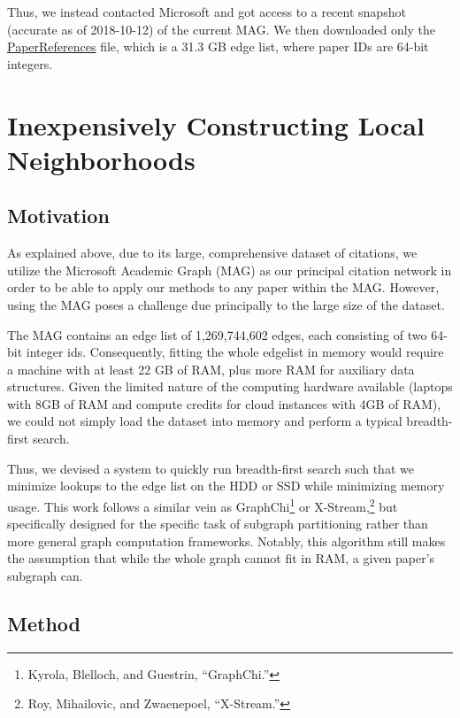 \documentclass[lettepaper,]{article}
\begin{document}
Thus, we instead contacted Microsoft and got access to a recent snapshot
(accurate as of 2018-10-12) of the current MAG. We then downloaded only
the
\href{https://docs.microsoft.com/en-us/academic-services/graph/reference-data-schema\#paperreferencestxt}{PaperReferences}
file, which is a 31.3 GB edge list, where paper IDs are 64-bit integers.

\hypertarget{inexpensively-constructing-local-neighborhoods}{%
\section{Inexpensively Constructing Local
Neighborhoods}\label{inexpensively-constructing-local-neighborhoods}}

\hypertarget{motivation}{%
\subsection{Motivation}\label{motivation}}

As explained above, due to its large, comprehensive dataset of
citations, we utilize the Microsoft Academic Graph (MAG) as our
principal citation network in order to be able to apply our methods to
any paper within the MAG. However, using the MAG poses a challenge due
principally to the large size of the dataset.

The MAG contains an edge list of 1,269,744,602 edges, each consisting of
two 64-bit integer ids. Consequently, fitting the whole edgelist in
memory would require a machine with at least 22 GB of RAM, plus more RAM
for auxiliary data structures. Given the limited nature of the computing
hardware available (laptops with 8GB of RAM and compute credits for
cloud instances with 4GB of RAM), we could not simply load the dataset
into memory and perform a typical breadth-first search.

Thus, we devised a system to quickly run breadth-first search such that
we minimize lookups to the edge list on the HDD or SSD while minimizing
memory usage. This work follows a similar vein as GraphChi\footnote{Kyrola,
  Blelloch, and Guestrin, ``GraphChi.''} or X-Stream,\footnote{Roy,
  Mihailovic, and Zwaenepoel, ``X-Stream.''} but specifically designed
for the specific task of subgraph partitioning rather than more general
graph computation frameworks. Notably, this algorithm still makes the
assumption that while the whole graph cannot fit in RAM, a given paper's
subgraph can.

\hypertarget{method}{%
\subsection{Method}\label{method}}
\end{document}
